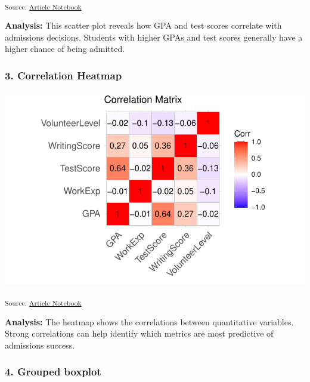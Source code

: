 \documentclass[
  letterpaper,
  DIV=11,
  numbers=noendperiod]{scrartcl}
\begin{document}
\textsubscript{Source:
\href{https://verkyyi.github.io/5900-hw1/index.qmd.html}{Article
Notebook}}

\textbf{Analysis:} This scatter plot reveals how GPA and test scores
correlate with admissions decisions. Students with higher GPAs and test
scores generally have a higher chance of being admitted.

\subsubsection{3. Correlation Heatmap}\label{correlation-heatmap}

\includegraphics{index_files/figure-pdf/correlation-heatmap-1.pdf}

\textsubscript{Source:
\href{https://verkyyi.github.io/5900-hw1/index.qmd.html}{Article
Notebook}}

\textbf{Analysis:} The heatmap shows the correlations between
quantitative variables. Strong correlations can help identify which
metrics are most predictive of admissions success.

\subsubsection{4. Grouped boxplot}\label{grouped-boxplot}
\end{document}
